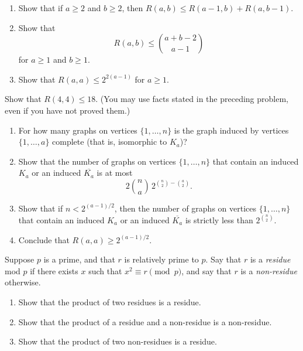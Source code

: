 \documentclass[12pt,letterpaper]{hmcpset}
\begin{document}

\begin{problem}[1]
    \begin{enumerate}
        \item Show that if $a\ge 2$ and $b\ge 2$, then $R(a,b)\le R(a-1,b) + R(a,b-1)$.
        \item Show that $$R(a,b)\le {a+b-2\choose a-1}$$ for $a\ge 1$ and $b\ge 1$.
        \item Show that $R(a,a) \le 2^{2(a-1)}$ for $a \ge 1$.
    \end{enumerate}
\end{problem}
\begin{solution}
    \vfill
\end{solution}
\newpage

\begin{problem}[2]
    Show that $R(4,4)\le 18$.  (You may use facts stated in the preceding problem, even if you have not proved them.)
\end{problem}
\begin{solution}
    \vfill
\end{solution}
\newpage

\begin{problem}[3]
    \begin{enumerate}
        \item For how many graphs on vertices $\{1,\ldots,n\}$ is the graph induced by vertices $\{1,\ldots, a\}$ complete (that is, isomorphic to $K_a$)?
        \item Show that the number of graphs on vertices $\{1,\ldots, n\}$ that contain an induced $K_a$ or an induced $\overline{K_a}$ is at most $$2{n\choose a}\,2^{{n\choose 2}-{a\choose 2}}.$$
        \item Show that if $n<2^{(a-1)/2}$, then the number of graphs on vertices $\{1,\ldots,n\}$ that contain an induced $K_a$ or an induced $\overline{K_a}$ is strictly less than $2^{n\choose 2}$.
        \item Conclude that $R(a,a) \ge 2^{(a-1)/2}$.
    \end{enumerate}
\end{problem}
\begin{solution}
    \vfill
\end{solution}
\newpage

\begin{problem}[4]
    Suppose $p$ is a prime, and that $r$ is relatively prime to $p$.  Say that $r$ is a {\it residue\/} mod $p$ if there exists $x$ such that $x^2\equiv r \pmod{p}$, and say that $r$ is a {\it non-residue\/} otherwise.
    \begin{enumerate}
        \item Show that the product of two residues is a residue.
        \item Show that the product of a residue and a non-residue is a non-residue.
        \item Show that the product of two non-residues is a residue.
    \end{enumerate}
\end{problem}
\begin{solution}
    \vfill
\end{solution}
\newpage
\end{document}
